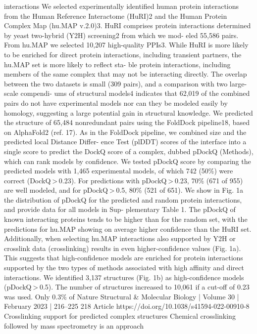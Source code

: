 interactions
We selected experimentally identified human protein interactions
from the Human Reference Interactome (HuRI)2 and the Human Protein
Complex Map (hu.MAP v.2.0)3. HuRI comprises protein interactions
determined by yeast two-hybrid (Y2H) screening2 from which we mod-
eled 55,586 pairs. From hu.MAP we selected 10,207 high-quality PPIs3.
While HuRI is more likely to be enriched for direct protein interactions,
including transient partners, the hu.MAP set is more likely to reflect sta-
ble protein interactions, including members of the same complex that
may not be interacting directly. The overlap between the two datasets
is small (309 pairs), and a comparison with two large-scale compendi-
ums of structural models4 indicates that 62,019 of the combined pairs
do not have experimental models nor can they be modeled easily by
homology, suggesting a large potential gain in structural knowledge.
We predicted the structure of 65,484 nonredundant pairs using the
FoldDock pipeline18, based on AlphaFold2 (ref. 17). As in the FoldDock
pipeline, we combined size and the predicted local Distance Differ-
ence Test (plDDT) scores of the interface into a single score to predict
the DockQ score of a complex, dubbed pDockQ (Methods), which can
rank models by confidence. We tested pDockQ score by comparing the
predicted models with 1,465 experimental models, of which 742 (50\%)
were correct (DockQ > 0.23). For predictions with pDockQ > 0.23, 70\%
(671 of 955) are well modeled, and for pDockQ > 0.5, 80\% (521 of 651).
We show in Fig. 1a the distribution of pDockQ for the predicted and
random protein interactions, and provide data for all models in Sup-
plementary Table 1. The pDockQ of known interacting proteins tends
to be higher than for the random set, with the predictions for hu.MAP
showing on average higher confidence than the HuRI set. Additionally,
when selecting hu.MAP interactions also supported by Y2H or crosslink
data (crosslinking) results in even higher-confidence values (Fig. 1a).
This suggests that high-confidence models are enriched for protein
interactions supported by the two types of methods associated with
high affinity and direct interactions. We identified 3,137 structures
(Fig. 1b) as high-confidence models (pDockQ > 0.5). The number of
structures increased to 10,061 if a cut-off of 0.23 was used. Only 0.3\% of
Nature Structural \& Molecular Biology | Volume 30 | February 2023 | 216–225
218
Article
https://doi.org/10.1038/s41594-022-00910-8
Crosslinking support for predicted complex
structures
Chemical crosslinking followed by mass spectrometry is an approach
